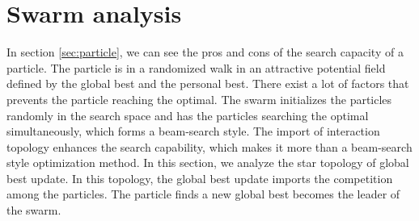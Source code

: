 \section{Swarm analysis}
\label{sec:swarm}




In section \ref{sec:particle}, we can see the pros and cons of the search capacity of a particle.
The particle is in a randomized walk in an attractive potential field defined by the global best and the personal best.
There exist a lot of factors that prevents the particle reaching the optimal.
The swarm initializes the particles randomly in the search space and has the particles searching the optimal simultaneously, which forms a beam-search style.
The import of interaction topology enhances the search capability, which makes it more than a beam-search style optimization method.
In this section, we analyze the star topology of global best update.
In this topology, the global best update imports the competition among the particles.
The particle finds a new global best becomes the leader of the swarm.


